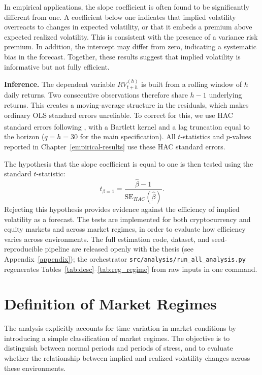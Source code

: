 \documentclass[11pt,a4paper,openany]{report}
\newcommand{\fcitet}[1]{%
  \citet{#1}%
  \refstepcounter{footnote}%
  \hyperlink{cite.#1}{\textsuperscript{\thefootnote}}%
  \footnotetext{\bibentry{#1}.}%
}
\begin{document}
In empirical applications, the slope coefficient is often found to be
significantly different from one. A coefficient below one indicates that
implied volatility overreacts to changes in expected volatility, or that
it embeds a premium above expected realized volatility. This is
consistent with the presence of a variance risk premium. In addition,
the intercept may differ from zero, indicating a systematic bias in the
forecast. Together, these results suggest that implied volatility is
informative but not fully efficient.

\textbf{Inference.} The dependent variable $RV^{(h)}_{t+h}$ is built
from a rolling window of $h$ daily returns. Two consecutive
observations therefore share $h-1$ underlying returns. This creates a
moving-average structure in the residuals, which makes ordinary OLS
standard errors unreliable. To correct for this, we use HAC standard
errors following \fcitet{newey1987}, with a Bartlett kernel and a lag
truncation equal to the horizon ($q = h = 30$ for the main
specification). All $t$-statistics and $p$-values reported in
Chapter~\ref{empirical-results} use these HAC standard errors.

The hypothesis that the slope coefficient is equal to one is then tested
using the standard $t$-statistic:
\begin{equation}
t_{\beta=1} = \frac{\hat{\beta} - 1}{\mathrm{SE}_{HAC}(\hat{\beta})}.
\label{eq:ttest}
\end{equation}
Rejecting this hypothesis provides evidence against the efficiency of
implied volatility as a forecast. The tests are implemented for both
cryptocurrency and equity markets and across market regimes, in order to
evaluate how efficiency varies across environments. The full estimation
code, dataset, and seed-reproducible pipeline are released openly with
the thesis (see Appendix~\ref{appendix}); the orchestrator
\texttt{src/analysis/run\_all\_analysis.py} regenerates
Tables~\ref{tab:desc}--\ref{tab:reg_regime} from raw inputs in one
command.

\section{Definition of Market
Regimes}\label{definition-of-market-regimes}

The analysis explicitly accounts for time variation in market conditions
by introducing a simple classification of market regimes. The objective
is to distinguish between normal periods and periods of stress, and to
evaluate whether the relationship between implied and realized
volatility changes across these environments.
\end{document}
